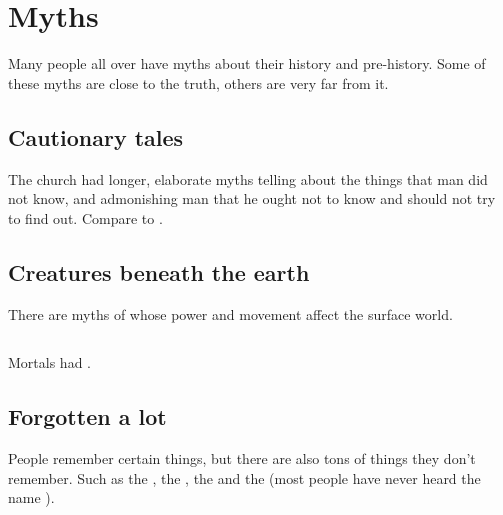 \section{Myths}
Many people all over \Miith{} have myths about their history and pre-history. Some of these myths are close to the truth, others are very far from it.









\subsection{Cautionary tales}
The \Iquinian church had longer, elaborate myths telling about the things that man did not know, and admonishing man that he ought not to know and should not try to find out.
Compare to \cite[]{LordDunsany:TheGodsofPegana}.









\subsection{Creatures beneath the earth}
There are myths of  whose power and movement affect the surface world. 









\subsection{\Dragons}
Mortals had . 









\subsection{Forgotten a lot}
People remember certain things, but there are also tons of things they don't remember. 
Such as the \banes, the \resphain, the \dragons{} and the \xss{} (most people have never heard the name \quo{\xs}). 

